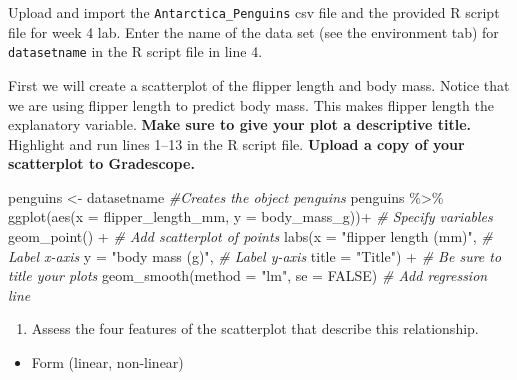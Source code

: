 \documentclass[
]{report}
\newenvironment{Shaded}{\begin{snugshade}}{\end{snugshade}}
\newcommand{\AttributeTok}[1]{\textcolor[rgb]{0.77,0.63,0.00}{#1}}
\newcommand{\CommentTok}[1]{\textcolor[rgb]{0.56,0.35,0.01}{\textit{#1}}}
\newcommand{\ConstantTok}[1]{\textcolor[rgb]{0.00,0.00,0.00}{#1}}
\newcommand{\FunctionTok}[1]{\textcolor[rgb]{0.00,0.00,0.00}{#1}}
\newcommand{\NormalTok}[1]{#1}
\newcommand{\OtherTok}[1]{\textcolor[rgb]{0.56,0.35,0.01}{#1}}
\newcommand{\SpecialCharTok}[1]{\textcolor[rgb]{0.00,0.00,0.00}{#1}}
\newcommand{\StringTok}[1]{\textcolor[rgb]{0.31,0.60,0.02}{#1}}
\providecommand{\tightlist}{%
  \setlength{\itemsep}{0pt}\setlength{\parskip}{0pt}}
\begin{document}
Upload and import the \texttt{Antarctica\_Penguins} csv file and the provided R script file for week 4 lab. Enter the name of the data set (see the environment tab) for \texttt{datasetname} in the R script file in line 4.

First we will create a scatterplot of the flipper length and body mass. Notice that we are using flipper length to predict body mass. This makes flipper length the explanatory variable. \textbf{Make sure to give your plot a descriptive title.} Highlight and run lines 1--13 in the R script file. \textbf{Upload a copy of your scatterplot to Gradescope.}

\begin{Shaded}
\begin{Highlighting}[]
\NormalTok{penguins }\OtherTok{\textless{}{-}}\NormalTok{ datasetname }\CommentTok{\#Creates the object penguins}
\NormalTok{penguins }\SpecialCharTok{\%\textgreater{}\%}
  \FunctionTok{ggplot}\NormalTok{(}\FunctionTok{aes}\NormalTok{(}\AttributeTok{x =}\NormalTok{ flipper\_length\_mm, }\AttributeTok{y =}\NormalTok{ body\_mass\_g))}\SpecialCharTok{+}  \CommentTok{\# Specify variables}
  \FunctionTok{geom\_point}\NormalTok{() }\SpecialCharTok{+}  \CommentTok{\# Add scatterplot of points}
  \FunctionTok{labs}\NormalTok{(}\AttributeTok{x =} \StringTok{"flipper length (mm)"}\NormalTok{,  }\CommentTok{\# Label x{-}axis}
       \AttributeTok{y =} \StringTok{"body mass (g)"}\NormalTok{,  }\CommentTok{\# Label y{-}axis}
       \AttributeTok{title =} \StringTok{"Title"}\NormalTok{) }\SpecialCharTok{+} \CommentTok{\# Be sure to title your plots}
  \FunctionTok{geom\_smooth}\NormalTok{(}\AttributeTok{method =} \StringTok{"lm"}\NormalTok{, }\AttributeTok{se =} \ConstantTok{FALSE}\NormalTok{)  }\CommentTok{\# Add regression line}
\end{Highlighting}
\end{Shaded}

\begin{enumerate}
\def\labelenumi{\arabic{enumi}.}
\tightlist
\item
  Assess the four features of the scatterplot that describe this relationship.
  \vspace{1mm}
\end{enumerate}

\begin{itemize}
\tightlist
\item
  Form (linear, non-linear)
\end{itemize}

\vspace{.1in}
\end{document}
